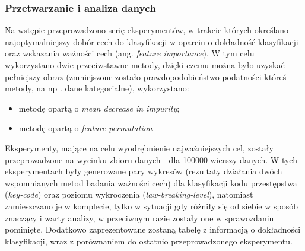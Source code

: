 \documentclass{classrep}
\begin{document}
{{            \subsubsection{Przetwarzanie i analiza danych} {
                Na wstępie przeprowadzono serię eksperymentów, w trakcie których
                określano najoptymalniejszy dobór cech do klasyfikacji w oparciu o
                dokładność klasyfikacji oraz wskazania ważności cech (ang.
                \textit{feature importance}). W tym celu wykorzystano dwie
                przeciwstawne metody, dzięki czemu można było uzyskać pełniejszy obraz
                (zmniejszone zostało prawdopodobieństwo podatności któreś metody, na np
                . dane kategorialne), wykorzystano:
                \begin{itemize}
                    \item metodę opartą o \textit{mean decrease in impurity};
                    \item metodę opartą o \textit{feature permutation}
                \end{itemize}

                Eksperymenty, mające na celu wyodrębnienie najważniejszych cel, zostały
                przeprowadzone na wycinku zbioru danych - dla 100000 wierszy danych. W
                tych eksperymentach były generowane pary wykresów (rezultaty działania
                dwóch wspomnianych metod badania ważności cech) dla klasyfikacji kodu
                przestępstwa (\textit{key-code}) oraz poziomu wykroczenia
                (\textit{law-breaking-level}), natomiast zamieszczano je w komplecie,
                tylko w sytuacji gdy różniły się od siebie w sposób znaczący i warty
                analizy, w przeciwnym razie zostały one w sprawozdaniu pominięte.
                Dodatkowo zaprezentowane zostaną tabelę z informacją o dokładności
                klasyfikacji, wraz z porównaniem do ostatnio przeprowadzonego
                eksperymentu.

}}}
\end{document}
